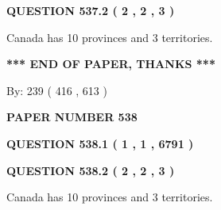 \documentclass[12pt]{article}
\begin{document}
\vspace{0.2in}
  
{\textbf{\Large{QUESTION
537.2 
 ( 2 , 2 , 3 )
}}}
  
  
 
 
\noindent{}
 
 
Canada has 10  provinces and 3 territories.
 
 
 
 
   
   
 \vspace{0.2in}
 
   
   
   
   
\vspace{1.0in} 
{\textbf{\large{ *** END OF PAPER, THANKS *** }}} 
   
   
\hspace{1.0in} By: 
 239 ( 416 ,  613 )
   
   
   
   
\newpage 
\setcounter{page}{ 
   538001 } 
   
   
   
   
 {\textbf{ \Large{ PAPER NUMBER  538  }}}
   
   
\vspace{0.2in}
   
   
   
   
   
   
 \vspace{0.2in}
 
 
 
 
   
   
  
\vspace{0.2in}
  
{\textbf{\Large{QUESTION
538.1 
 ( 1 , 1 , 6791 )
}}}
  
  
  
\vspace{0.2in}
  
{\textbf{\Large{QUESTION
538.2 
 ( 2 , 2 , 3 )
}}}
  
  
 
 
\noindent{}
 
 
Canada has 10  provinces and 3 territories.
 
\end{document}
